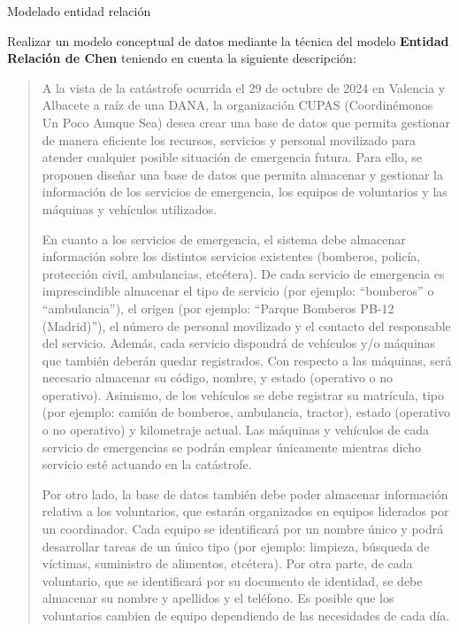 \documentclass[12pt,a4paper,addpoints,answers]{exam}
\begin{document}
\begin{questions}

\question[2\half] Modelado entidad relación

Realizar un modelo conceptual de datos mediante la técnica del modelo \textbf{Entidad Relación de Chen} teniendo en cuenta la siguiente descripción:

\begin{quotation}
A la vista de la catástrofe ocurrida el 29 de octubre de 2024 en Valencia y Albacete a raíz de una DANA, la organización CUPAS (Coordinémonos Un Poco Aunque Sea) desea crear una base de datos que permita gestionar de manera eficiente los recursos, servicios y personal movilizado para atender cualquier posible situación de emergencia futura. Para ello, se proponen diseñar una base de datos que permita almacenar y gestionar la información de los servicios de emergencia, los equipos de voluntarios y las máquinas y vehículos utilizados.

En cuanto a los servicios de emergencia, el sistema debe almacenar información sobre los distintos servicios existentes (bomberos, policía, protección civil, ambulancias, etcétera). De cada servicio de emergencia es imprescindible almacenar el tipo de servicio (por ejemplo: ``bomberos'' o ``ambulancia''), el origen (por ejemplo: ``Parque Bomberos PB-12 (Madrid)''), el número de personal movilizado y el contacto del responsable del servicio. Además, cada servicio dispondrá de vehículos y/o máquinas que también deberán quedar registrados. Con respecto a las máquinas, será necesario almacenar su código, nombre, y estado (operativo o no operativo). Asimismo, de los vehículos se debe registrar su matrícula, tipo (por ejemplo: camión de bomberos, ambulancia, tractor), estado (operativo o no operativo) y kilometraje actual. Las máquinas y vehículos de cada servicio de emergencias se podrán emplear únicamente mientras dicho servicio esté actuando en la catástrofe.

Por otro lado, la base de datos también debe poder almacenar información relativa a los voluntarios, que estarán organizados en equipos liderados por un coordinador. Cada equipo se identificará por un nombre único y podrá desarrollar tareas de un único tipo (por ejemplo: limpieza, búsqueda de víctimas, suministro de alimentos, etcétera). Por otra parte, de cada voluntario, que se identificará por su documento de identidad, se debe almacenar su nombre y apellidos y el teléfono. Es posible que los voluntarios cambien de equipo dependiendo de las necesidades de cada día.


\end{quotation}
\end{questions}
\end{document}
